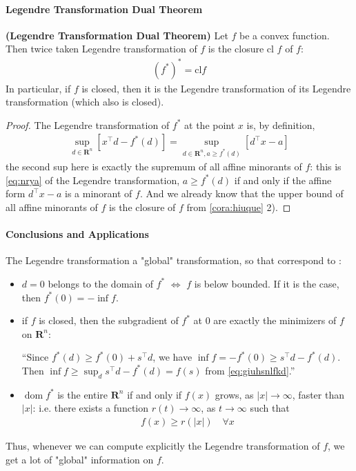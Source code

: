 \documentclass{article}
\newcommand{\bfs}[1]{\textbf{({#1}) }}
\newcommand{\dom}{\operatorname{dom}}
\begin{document}
\paragraph{Legendre Transformation Dual Theorem}
\begin{thma}\bfs{Legendre Transformation Dual Theorem}
 Let $f$ be a convex function. Then twice taken Legendre transformation of $f$ is the closure cl $f$ of $f:$
\begin{align*}
(f^{*})^{*}=\mathrm{cl} f
\end{align*}
In particular, if $f$ is closed, then it is the Legendre transformation of its Legendre transformation (which also is closed).
\end{thma} 
\begin{proof}\color{ForestGreen}
The Legendre transformation of $f^{*}$ at the point $x$ is, by definition,
\begin{align}
\sup _{d \in \mathbf{R}^{n}}\left[x^{\top} d-f^{*}(d)\right]=\sup _{d \in \mathbf{R}^{n}, a \geq f^{*}(d)}\left[d^{\top} x-a\right]\label{eq:giuhsnlfkd}
\end{align}
the second sup here is exactly the supremum of all affine minorants of $f$: this is \cref{eq:nrya} of the Legendre transformation, $a \geq f^{*}(d)$ if and only if the affine form $d^{\top} x-a$ is a minorant of $f$. And we already know that the upper bound of all affine minorants of $f$ is the closure of $f$ from \cref{cora:hiuque} 2).
\end{proof} 
\paragraph{Conclusions and Applications}
The Legendre transformation a "global" transformation, so that  correspond to :
\begin{itemize}
    \item $d=0$ belongs to the domain of $f^{*}$ $\Longleftrightarrow$ $f$ is below bounded. If it is the case, then $f^{*}(0)=-\inf f$.
    \item if $f$ is closed, then the subgradient of $f^{*}$ at $0$ are exactly the minimizers of $f$ on $\mathbf{R}^{n}$:
    
    ``Since $f^*(d)\ge f^*(0)+s^{\top}d$, we have $\inf f= -f^*(0)\ge s^{\top}d -f^*(d)$. Then $\inf f\ge \sup_d s^{\top}d -f^*(d) = f(s)$ from \cref{eq:giuhsnlfkd}.''
    \item $\dom  f^{*}$ is the entire $\mathbf{R}^{n}$ if and only if $f(x)$ grows, as $|x| \rightarrow \infty$, faster than $|x|$: i.e. there exists a function $r(t) \rightarrow \infty$, as $t \rightarrow \infty$ such that   
\begin{align*}
f(x) \geq r(|x|) \quad \forall x
\end{align*}
\end{itemize}
Thus, whenever we can compute explicitly the Legendre transformation of $f$, we get a lot of "global" information on $f$. 
\end{document}
